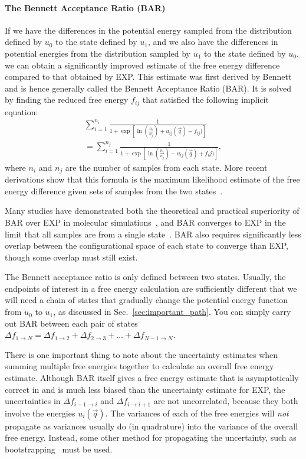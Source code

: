 \documentclass[9pt,bestpractices]{livecoms}
\begin{document}
\paragraph{The Bennett Acceptance Ratio (BAR)}
If we have the differences in the potential energy sampled from the distribution defined by $u_0$ to the state defined by $u_1$, and we also have the differences in potential energies from the distribution sampled by $u_1$ to the state defined by $u_0$, we can obtain a significantly improved estimate of the
free energy difference compared to that obtained by EXP. 
This estimate was first derived by Bennett and is hence generally called the Bennett Acceptance Ratio (BAR). It is solved by finding the reduced free energy $f_{ij}$ that satisfied the following implicit equation:
\begin{eqnarray}
 \sum_{i=1}^{n_i} \frac{1}{1 + \exp[\ln(\frac{n_i}{n_j}) + u_{ij}(\vec{q}) - f_{ij})
 ]} \nonumber \\
 =\sum_{i=1}^{n_j} \frac{1}{1 + \exp[\ln(\frac{n_i}{n_j}) - u_{ij}(\vec{q}) + f_ij)]},
\end{eqnarray}
where $n_i$ and $n_j$ are the number of samples from each state. More recent derivations show that this formula is the maximum likelihood estimate of the free energy difference given sets of samples from the two states~\cite{shirts2003equilibriuma}. 

Many studies have demonstrated both the theoretical and practical superiority of BAR over EXP in molecular
simulations~\cite{shirts2005comparison,lu2003appropriate}, and BAR converges to EXP in the limit that all samples are from a single state~\cite{bennett1976efficient,bennett1976efficient,shirts2003equilibriuma}. BAR also requires significantly less overlap between the configurational space of each state to converge than EXP, though some overlap must still exist.

The Bennett acceptance ratio is only defined between two states. Usually, the endpoints of interest in a free energy calculation are sufficiently different that we will need a chain of states that gradually change the potential energy function from $u_0$ to $u_1$, as discussed in Sec.~\ref{sec:important_path}. You can simply carry out BAR between each pair of states $\Delta f_{1 \rightarrow N} = \Delta {f_{1\rightarrow 2}} + \Delta {f_{2\rightarrow 3}} +  \ldots + \Delta f_{N-1\rightarrow N}$.

There is one important thing to note about the uncertainty estimates when summing multiple free energies together to calculate an overall free energy estimate. Although BAR itself gives a free energy estimate that is asymptotically correct in and is much less biased than the uncertainty estimate for EXP, the uncertainties in $\Delta {f_{i-1\rightarrow i}}$ and $\Delta {f_{i\rightarrow i+1}}$ are not uncorrelated, because they both involve the energies $u_i(\vec{q})$. The variances of each of the free energies will \textit{not} propagate as variances usually do (in quadrature) into the variance of the overall free energy. Instead, some other method for propagating the uncertainty, such as bootstrapping~\cite{grossfield2018best} must be used.
\end{document}

